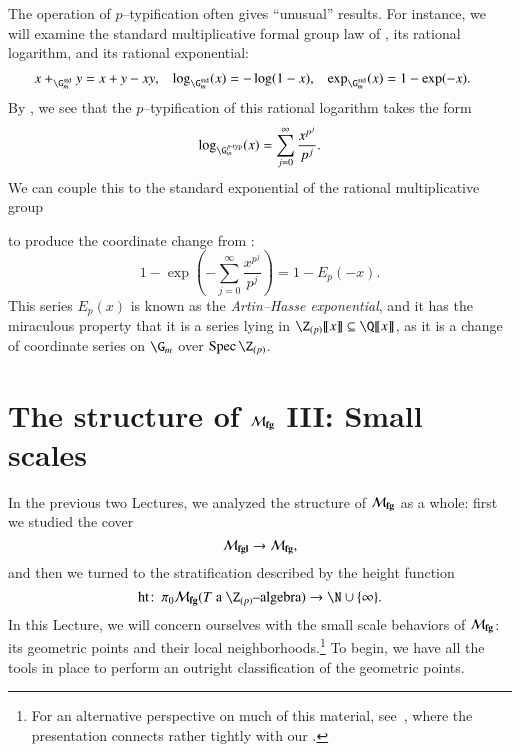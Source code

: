 \begin{remark}\label{ArtinHasseExponential}
The operation of $p$--typification often gives ``unusual'' results.  For instance, we will examine the standard multiplicative formal group law of , its rational logarithm, and its rational exponential:
\begin{align*}
x +_{\G_m^{\mathrm{std}}} y & = x + y - xy, &
\log_{\G_m^{\mathrm{std}}}(x) & = -\log(1 - x), &
\exp_{\G_m^{\mathrm{std}}}(x) & = 1 - \exp(-x).
\end{align*}
By , we see that the $p$--typification of this rational logarithm takes the form \[\log_{\G_m^{\ptyp}}(x) = \sum_{j=0}^\infty \frac{x^{p^j}}{p^j}.\]  We can couple this to the standard exponential of the rational multiplicative group
\begin{center}
\end{center}
to produce the coordinate change from : \[1 - \exp \left( -\sum_{j=0}^\infty \frac{x^{p^j}}{p^j} \right) = 1 - E_p(-x).\]  This series $E_p(x)$ is known as the \textit{Artin--Hasse exponential}, and it has the miraculous property that it is a series lying in $\Z_{(p)}\ps{x} \subseteq \Q\ps{x}$, as it is a change of coordinate series on $\G_m$ over $\Spec \Z_{(p)}$.
\end{remark}






\section{The structure of \texorpdfstring{$\mathcal{M}_{\mathbf{fg}}$}{Mfg} III: Small scales}\label{SectionMfgSmallScales}

In the previous two Lectures, we analyzed the structure of $\mathcal{M}_{\mathbf{fg}}$ as a whole: first we studied the cover \[\mathcal{M}_{\mathbf{fgl}} \to \mathcal{M}_{\mathbf{fg}},\] and then we turned to the stratification described by the height function \[\height\co \pi_0 \moduli{fg}(\text{$T$ a $\Z_{(p)}$--algebra}) \to \N \cup \{\infty\}.\]  In this Lecture, we will concern ourselves with the small scale behaviors of $\mathcal{M}_{\mathbf{fg}}$: its geometric points and their local neighborhoods.\footnote{For an alternative perspective on much of this material, see~\cite[Section 18]{StricklandFGNotes}, where the presentation connects rather tightly with our .}  To begin, we have all the tools in place to perform an outright classification of the geometric points.


